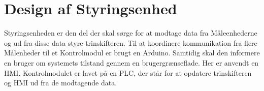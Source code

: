 
\chapter{Design af Styringsenhed}

Styringsenheden er den del der skal sørge for at modtage data fra Måleenhederne og ud fra disse data styre trinskifteren. Til at koordinere kommunikation fra flere Målenheder til et Kontrolmodul er brugt en Arduino. Samtidig skal den informere en bruger om systemets tilstand gennem en brugergrænseflade. Her er anvendt en HMI. Kontrolmodulet er lavet på en PLC, der står for at opdatere trinskifteren og HMI ud fra de modtagende data.

